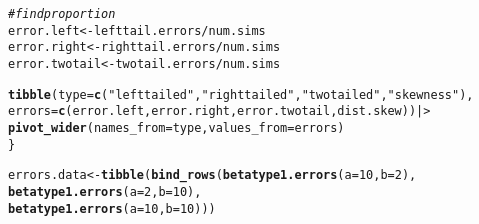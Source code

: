 \documentclass{article}\usepackage[]{graphicx}\usepackage[]{xcolor}
\makeatletter
\newcommand{\hlnum}[1]{\textcolor[rgb]{0.686,0.059,0.569}{#1}}%
\newcommand{\hlsng}[1]{\textcolor[rgb]{0.192,0.494,0.8}{#1}}%
\newcommand{\hlcom}[1]{\textcolor[rgb]{0.678,0.584,0.686}{\textit{#1}}}%
\newcommand{\hlopt}[1]{\textcolor[rgb]{0,0,0}{#1}}%
\newcommand{\hldef}[1]{\textcolor[rgb]{0.345,0.345,0.345}{#1}}%
\newcommand{\hlkwb}[1]{\textcolor[rgb]{0.69,0.353,0.396}{#1}}%
\newcommand{\hlkwc}[1]{\textcolor[rgb]{0.333,0.667,0.333}{#1}}%
\newcommand{\hlkwd}[1]{\textcolor[rgb]{0.737,0.353,0.396}{\textbf{#1}}}%
\newenvironment{kframe}{%
 \def\at@end@of@kframe{}%
 \ifinner\ifhmode%
  \def\at@end@of@kframe{\end{minipage}}%
  \begin{minipage}{\columnwidth}%
 \fi\fi%
 \def\FrameCommand##1{\hskip\@totalleftmargin \hskip-\fboxsep
 \colorbox{shadecolor}{##1}\hskip-\fboxsep
     \hskip-\linewidth \hskip-\@totalleftmargin \hskip\columnwidth}%
 \MakeFramed {\advance\hsize-\width
   \@totalleftmargin\z@ \linewidth\hsize
   \@setminipage}}%
 {\par\unskip\endMakeFramed%
 \at@end@of@kframe}
\newenvironment{knitrout}{}{} %
\makeatother
\begin{document}
\begin{enumerate}
\begin{knitrout}
\begin{kframe}
\begin{alltt}
\hlcom{# find proportion}
\hldef{error.left} \hlkwb{<-} \hldef{lefttail.errors}\hlopt{/}\hldef{num.sims}
\hldef{error.right} \hlkwb{<-} \hldef{righttail.errors}\hlopt{/}\hldef{num.sims}
\hldef{error.twotail} \hlkwb{<-} \hldef{twotail.errors}\hlopt{/}\hldef{num.sims}

\hlkwd{tibble}\hldef{(}\hlkwc{type} \hldef{=} \hlkwd{c}\hldef{(}\hlsng{"left tailed"}\hldef{,} \hlsng{"right tailed"}\hldef{,} \hlsng{"two tailed"}\hldef{,} \hlsng{"skewness"}\hldef{),}
       \hlkwc{errors} \hldef{=} \hlkwd{c}\hldef{(error.left, error.right, error.twotail, dist.skew)) |>}
  \hlkwd{pivot_wider}\hldef{(}\hlkwc{names_from} \hldef{= type,} \hlkwc{values_from} \hldef{= errors)}
\hldef{\}}

\hldef{errors.data} \hlkwb{<-} \hlkwd{tibble}\hldef{(}\hlkwd{bind_rows}\hldef{(}\hlkwd{betatype1.errors}\hldef{(}\hlkwc{a} \hldef{=} \hlnum{10}\hldef{,} \hlkwc{b} \hldef{=} \hlnum{2}\hldef{),}
\hlkwd{betatype1.errors}\hldef{(}\hlkwc{a} \hldef{=} \hlnum{2}\hldef{,} \hlkwc{b} \hldef{=} \hlnum{10}\hldef{),}
\hlkwd{betatype1.errors}\hldef{(}\hlkwc{a} \hldef{=} \hlnum{10}\hldef{,} \hlkwc{b} \hldef{=} \hlnum{10}\hldef{)))}


\end{alltt}
\end{kframe}
\end{knitrout}
\end{enumerate}
\end{document}

